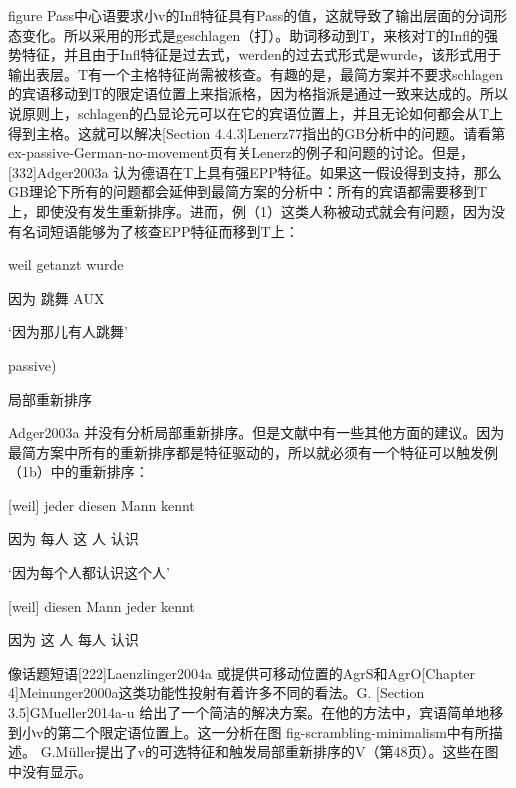 figure
Pass中心语要求小v的Infl特征具有Pass的值，这就导致了输出层面的分词形态变化。所以采用的形式是geschlagen（打）。助词移动到T，来核对T的Infl的强势特征，并且由于Infl特征是过去式，werden的过去式形式是wurde，该形式用于输出表层。T有一个主格特征尚需被核查。有趣的是，最简方案并不要求schlagen的宾语移动到T的限定语位置上来指派格，因为格指派是通过一致来达成的。所以说原则上，schlagen的凸显论元可以在它的宾语位置上，并且无论如何都会从T上得到主格。这就可以解决[Section 4.4.3]Lenerz77指出的GB分析中的问题。请看第 ex-passive-German-no-movement页有关Lenerz的例子和问题的讨论。但是，[332]Adger2003a 认为德语在T上具有强EPP特征。如果这一假设得到支持，那么GB理论下所有的问题都会延伸到最简方案的分析中：所有的宾语都需要移到T上，即使没有发生重新排序。进而，例（1）这类人称被动式就会有问题，因为没有名词短语能够为了核查EPP特征而移到T上：
















weil getanzt wurde

     因为 跳舞 AUX

`因为那儿有人跳舞'



passive)

局部重新排序


Adger2003a 并没有分析局部重新排序。但是文献中有一些其他方面的建议。因为最简方案中所有的重新排序都是特征驱动的，所以就必须有一个特征可以触发例（1b）中的重新排序：





[weil] jeder diesen Mann kennt

	 因为 每人 这 人 认识

`因为每个人都认识这个人'



[weil] diesen Mann jeder kennt

	 因为 这 人 每人 认识



像话题短语[222]Laenzlinger2004a 或提供可移动位置的AgrS和AgrO[Chapter 4]Meinunger2000a这类功能性投射有着许多不同的看法。G. [Section 3.5]GMueller2014a-u 给出了一个简洁的解决方案。在他的方法中，宾语简单地移到小v的第二个限定语位置上。这一分析在图 fig-scrambling-minimalism中有所描述。 
G.Müller提出了v的可选特征和触发局部重新排序的V（第48页）。这些在图中没有显示。
 








